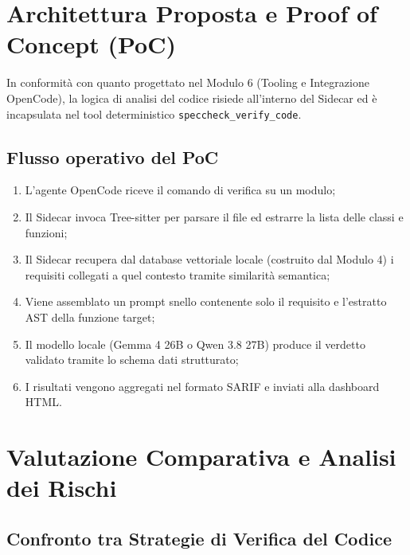\documentclass[a4paper, 11pt]{article}
\begin{document}

\section{Architettura Proposta e Proof of Concept (PoC)}
In conformità con quanto progettato nel Modulo 6 (Tooling e Integrazione OpenCode), la logica di analisi del codice risiede all'interno del Sidecar ed è incapsulata nel tool deterministico \texttt{speccheck\_verify\_code}.

\subsection{Flusso operativo del PoC}
\begin{enumerate}
    \item L'agente OpenCode riceve il comando di verifica su un modulo;
    \item Il Sidecar invoca Tree-sitter per parsare il file ed estrarre la lista delle classi e funzioni;
    \item Il Sidecar recupera dal database vettoriale locale (costruito dal Modulo 4) i requisiti collegati a quel contesto tramite similarità semantica;
    \item Viene assemblato un prompt snello contenente solo il requisito e l'estratto AST della funzione target;
    \item Il modello locale (Gemma 4 26B o Qwen 3.8 27B) produce il verdetto validato tramite lo schema dati strutturato;
    \item I risultati vengono aggregati nel formato SARIF e inviati alla dashboard HTML.
\end{enumerate}


\section{Valutazione Comparativa e Analisi dei Rischi}

\subsection{Confronto tra Strategie di Verifica del Codice}
\end{document}
